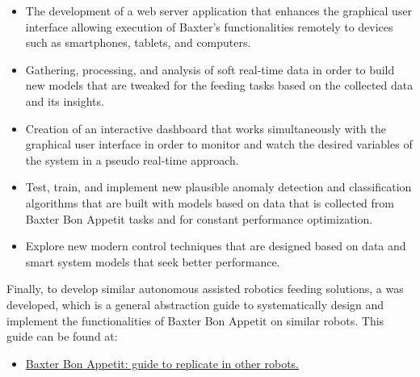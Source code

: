 \documentclass[11pt]{report} %
\begin{document}
\begin{itemize}
    \item The development of a web server application that enhances the graphical user interface allowing execution of Baxter's functionalities remotely to devices such as smartphones, tablets, and computers.
    \item Gathering, processing, and analysis of soft real-time data in order to build new models that are tweaked for the feeding tasks based on the collected data and its insights.
    \item Creation of an interactive dashboard that works simultaneously with the graphical user interface in order to monitor and watch the desired variables of the system in a pseudo real-time approach.
    \item Test, train, and implement new plausible anomaly detection and classification algorithms that are built with models based on data that is collected from Baxter Bon Appetit tasks and for constant performance optimization.
    \item Explore new modern control techniques that are designed based on data and smart system models that seek better performance.
\end{itemize}

Finally, to develop similar autonomous assisted robotics feeding solutions, a  was developed, which is a general abstraction guide to systematically design and implement the functionalities of Baxter Bon Appetit on similar robots. This guide can be found at:

\begin{itemize}
    \color{blue}
    \item \href{https://github.com/san99tiago/baxter-bon-appetit/blob/main/guide_to_replicate_in_other_robots.md}{Baxter Bon Appetit: guide to replicate in other robots.}
\end{itemize}

\renewcommand{\bibname}{References}

\begin{sloppypar}
    
    
\end{sloppypar}
\end{document}
